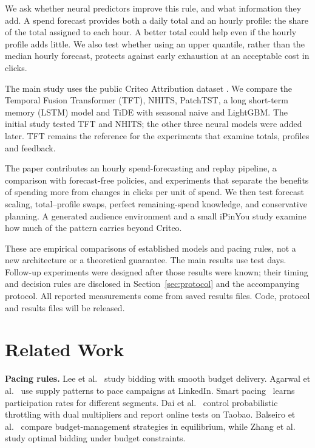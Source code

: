 \documentclass[sigconf,nonacm]{acmart}
\begin{document}
We ask whether neural predictors improve this rule, and what information they
add. A spend forecast provides both a daily total and an hourly profile: the
share of the total assigned to each hour. A better total could help even if the
hourly profile adds little. We also test whether using an upper quantile,
rather than the median hourly forecast, protects against early exhaustion at
an acceptable cost in clicks.

The main study uses the public Criteo Attribution dataset
\cite{diemert2017attribution}. We compare the Temporal Fusion Transformer
(TFT), NHITS, PatchTST, a long short-term memory (LSTM) model and TiDE with
seasonal naive and LightGBM. The initial study tested TFT and NHITS; the other
three neural models were added later. TFT remains the reference for the
experiments that examine totals, profiles and feedback.

The paper contributes an hourly spend-forecasting and replay pipeline, a
comparison with forecast-free policies, and experiments that separate the
benefits of spending more from changes in clicks per unit of spend. We then
test forecast scaling, total--profile swaps, perfect remaining-spend knowledge,
and conservative planning. A generated audience environment and a small
iPinYou study examine how much of the pattern carries beyond Criteo.

These are empirical comparisons of established models and pacing rules, not a
new architecture or a theoretical guarantee. The main results use
 test days. Follow-up experiments were designed after those
results were known; their timing and decision rules are disclosed in
Section~\ref{sec:protocol} and the accompanying protocol. All reported
measurements come from saved results files. Code, protocol and results files
will be released.

\section{Related Work}

\textbf{Pacing rules.} Lee et al.~\cite{lee2013real} study bidding with smooth
budget delivery. Agarwal et al.~\cite{agarwal2014budget} use supply patterns to
pace campaigns at LinkedIn. Smart pacing~\cite{xu2015smart} learns participation
rates for different segments. Dai et al.~\cite{dai2023percentile} control
probabilistic throttling with dual multipliers and report online tests on
Taobao. Balseiro et al.~\cite{balseiro2017budget} compare budget-management
strategies in equilibrium, while Zhang et al.~\cite{zhang2014optimal} study
optimal bidding under budget constraints.
\end{document}
